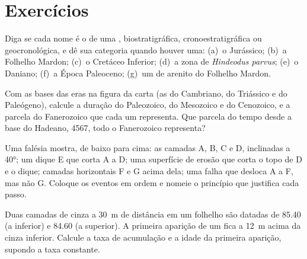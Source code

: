 \section{Exercícios}

\begin{exercise}[$\star$]\label{exo:b1:stratigraphic-scale:1}
Diga se cada nome é o de uma , biostratigráfica, cronoestratigráfica
ou geocronológica, e dê sua categoria quando houver uma: (a)~o  Jurássico; (b)~a
 Folhelho Mardon; (c)~o Cretáceo Inferior; (d)~a zona de \emph{Hindeodus parvus};
(e)~o  Daniano; (f)~a Época Paleoceno; (g)~um  de arenito do Folhelho Mardon.
\end{exercise}

\begin{exercise}[$\star$]\label{exo:b1:stratigraphic-scale:2}
Com as bases das eras na figura da carta (as do Cambriano, do Triássico e do Paleógeno),
calcule a duração do Paleozoico, do Mesozoico e do Cenozoico, e a parcela do Fanerozoico que
cada um representa. Que parcela do tempo desde a base do Hadeano, \qty{4567}{\Ma}, todo o
Fanerozoico representa?
\end{exercise}

\begin{exercise}[$\star$]\label{exo:b1:stratigraphic-scale:3}
Uma falésia mostra, de baixo para cima: as camadas A, B, C e D, inclinadas a \ang{40}; um dique
E que corta A a D; uma superfície de erosão que corta o topo de D e o dique; camadas
horizontais F e G acima dela; uma falha que desloca A a F, mas não G. Coloque os eventos em
ordem e nomeie o princípio que justifica cada passo.
\end{exercise}

\begin{exercise}[$\star$]\label{exo:b1:stratigraphic-scale:4}
Duas camadas de cinza a \qty{30}{m} de distância em um folhelho são datadas de \qty{85.40}{\Ma}
(a inferior) e \qty{84.60}{\Ma} (a superior). A primeira aparição de um  fica a
\qty{12}{m} acima da cinza inferior. Calcule a taxa de acumulação e a idade da primeira
aparição, supondo a taxa constante.
\end{exercise}


